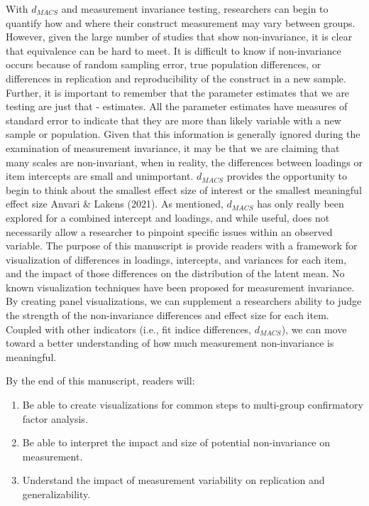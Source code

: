 \documentclass[
  man]{apa6}
\providecommand{\tightlist}{%
  \setlength{\itemsep}{0pt}\setlength{\parskip}{0pt}}
\begin{document}
With \(d_{MACS}\) and measurement invariance testing, researchers can begin to quantify how and where their construct measurement may vary between groups. However, given the large number of studies that show non-invariance, it is clear that equivalence can be hard to meet. It is difficult to know if non-invariance occurs because of random sampling error, true population differences, or differences in replication and reproducibility of the construct in a new sample. Further, it is important to remember that the parameter estimates that we are testing are just that - estimates. All the parameter estimates have measures of standard error to indicate that they are more than likely variable with a new sample or population. Given that this information is generally ignored during the examination of measurement invariance, it may be that we are claiming that many scales are non-invariant, when in reality, the differences between loadings or item intercepts are small and unimportant. \(d_{MACS}\) provides the opportunity to begin to think about the smallest effect size of interest or the smallest meaningful effect size Anvari \& Lakens (2021). As mentioned, \(d_{MACS}\) has only really been explored for a combined intercept and loadings, and while useful, does not necessarily allow a researcher to pinpoint specific issues within an observed variable. The purpose of this manuscript is provide readers with a framework for visualization of differences in loadings, intercepts, and variances for each item, and the impact of those differences on the distribution of the latent mean. No known visualization techniques have been proposed for measurement invariance. By creating panel visualizations, we can supplement a researchers ability to judge the strength of the non-invariance differences and effect size for each item. Coupled with other indicators (i.e., fit indice differences, \(d_{MACS}\)), we can move toward a better understanding of how much measurement non-invariance is meaningful.

By the end of this manuscript, readers will:

\begin{enumerate}
\def\labelenumi{\arabic{enumi}.}
\tightlist
\item
  Be able to create visualizations for common steps to multi-group confirmatory factor analysis.
\item
  Be able to interpret the impact and size of potential non-invariance on measurement.
\item
  Understand the impact of measurement variability on replication and generalizability.
\end{enumerate}
\end{document}
